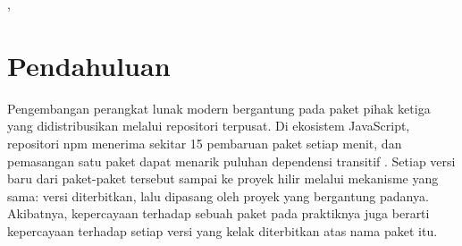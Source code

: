 \documentclass[a4paper,fleqn]{cas-dc}
\begin{document}
\let\WriteBookmarks\relax
\def\floatpagepagefraction{1}
\def\textpagefraction{.001}

\shorttitle{}
\shortauthors{}

\title[mode=title]{}

\author[1]{}
\cormark[1]
\ead{}
\credit{}



\begin{abstract}
hallo
\end{abstract}

\begin{highlights}
\item
\item
\item
\end{highlights}

\begin{keywords}
\sep
\end{keywords}

\maketitle

\section{Pendahuluan}\label{sec:intro}


Pengembangan perangkat lunak modern bergantung pada paket pihak ketiga yang
didistribusikan melalui repositori terpusat. Di ekosistem JavaScript, repositori
npm menerima sekitar 15 pembaruan paket setiap menit, dan pemasangan satu paket
dapat menarik puluhan dependensi transitif \citep{wyss2025evaluating}. Setiap
versi baru dari paket-paket tersebut sampai ke proyek hilir melalui mekanisme
yang sama: versi diterbitkan, lalu dipasang oleh proyek yang bergantung padanya.
Akibatnya, kepercayaan terhadap sebuah paket pada praktiknya juga berarti
kepercayaan terhadap setiap versi yang kelak diterbitkan atas nama paket itu.
\end{document}
